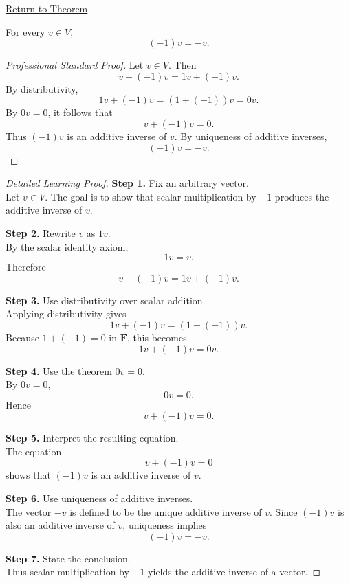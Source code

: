 
\newpage
{}
\label{prf:minus-one-times-vector}

\begin{remark*}[Return]
\hyperref[thm:minus-one-times-vector]{Return to Theorem}
\end{remark*}

\begin{theorem*}[($-1)v=-v$]
For every $v \in V$,
\[
(-1)v=-v.
\]
\end{theorem*}

\begin{proof}[Professional Standard Proof]
\LRAProofBodyStart
Let $v \in V$. Then
\[
v+(-1)v=1v+(-1)v.
\]
By distributivity,
\[
1v+(-1)v=(1+(-1))v=0v.
\]
By \hyperref[thm:zero-scalar-times-vector]{$0v=0$}, it follows that
\[
v+(-1)v=0.
\]
Thus $(-1)v$ is an additive inverse of $v$. By uniqueness of additive inverses,
\[
(-1)v=-v.
\]
\end{proof}

\begin{proof}[Detailed Learning Proof]
\LRAProofBodyStart

\textbf{Step 1.} Fix an arbitrary vector.\\
Let $v \in V$. The goal is to show that scalar multiplication by $-1$ produces the additive inverse of $v$.

\textbf{Step 2.} Rewrite $v$ as $1v$.\\
By the scalar identity axiom,
\[
1v=v.
\]
Therefore
\[
v+(-1)v=1v+(-1)v.
\]

\textbf{Step 3.} Use distributivity over scalar addition.\\
Applying distributivity gives
\[
1v+(-1)v=(1+(-1))v.
\]
Because $1+(-1)=0$ in $\mathbf{F}$, this becomes
\[
1v+(-1)v=0v.
\]

\textbf{Step 4.} Use the theorem $0v=0$.\\
By \hyperref[thm:zero-scalar-times-vector]{$0v=0$},
\[
0v=0.
\]
Hence
\[
v+(-1)v=0.
\]

\textbf{Step 5.} Interpret the resulting equation.\\
The equation
\[
v+(-1)v=0
\]
shows that $(-1)v$ is an additive inverse of $v$.

\textbf{Step 6.} Use uniqueness of additive inverses.\\
The vector $-v$ is defined to be the unique additive inverse of $v$. Since $(-1)v$ is also an additive inverse of $v$, uniqueness implies
\[
(-1)v=-v.
\]

\textbf{Step 7.} State the conclusion.\\
Thus scalar multiplication by $-1$ yields the additive inverse of a vector.
\end{proof}

